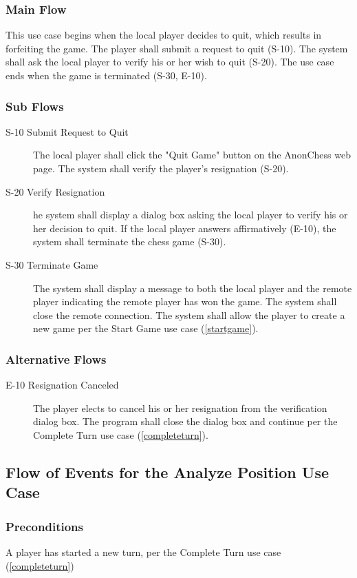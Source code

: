 \subsubsection{Main Flow}
This use case begins when the local player decides to quit, which results in forfeiting the game.  The player shall submit a request to quit (S-10).  The system shall ask the local player to verify his or her wish to quit (S-20). The use case ends when the game is terminated (S-30, E-10).
\subsubsection{Sub Flows}
\begin{description}
\item[S-10 Submit Request to Quit] The local player shall click the "Quit Game" button on the AnonChess web page.  The system shall verify the player's resignation (S-20).
\item[S-20 Verify Resignation] he system shall display a dialog box asking the local player to verify his or her decision to quit.  If the local player answers affirmatively (E-10), the system shall terminate the chess game (S-30).
\item[S-30 Terminate Game] The system shall display a message to both the local player and the remote player indicating the remote player has won the game.  The system shall close the remote connection.  The system shall allow the player to create a new game per the Start Game use case (\ref{startgame}). 
\end{description}
\subsubsection{Alternative Flows}
\begin{description}
\item[E-10 Resignation Canceled] The player elects to cancel his or her resignation from the verification dialog box. The program shall close the dialog box and continue per the Complete Turn use case (\ref{completeturn}). 
\end{description}

\subsection{Flow of Events for the Analyze Position Use Case }
\label{analpos}
\subsubsection{Preconditions}
 A player has started a new turn, per the Complete Turn use case (\ref{completeturn})
